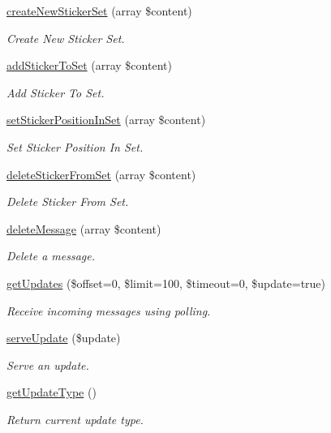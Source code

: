 \begin{DoxyCompactItemize}
\hyperlink{class_telegram_aa9ae79c6d122a0e0a88fb3b81e48aff1}{create\-New\-Sticker\-Set} (array \$content)
\begin{DoxyCompactList}\small\item\em Create New Sticker Set. \end{DoxyCompactList}\item 
\hyperlink{class_telegram_a1dd9ac39878694581875b53f100189da}{add\-Sticker\-To\-Set} (array \$content)
\begin{DoxyCompactList}\small\item\em Add Sticker To Set. \end{DoxyCompactList}\item 
\hyperlink{class_telegram_afe5e2d14ddabfb88fea538c2c778b3d8}{set\-Sticker\-Position\-In\-Set} (array \$content)
\begin{DoxyCompactList}\small\item\em Set Sticker Position In Set. \end{DoxyCompactList}\item 
\hyperlink{class_telegram_a98b2c8abebbc2e53bb02dbb2757238ae}{delete\-Sticker\-From\-Set} (array \$content)
\begin{DoxyCompactList}\small\item\em Delete Sticker From Set. \end{DoxyCompactList}\item 
\hyperlink{class_telegram_af46503521fd05da7d9e42313c5f29dd6}{delete\-Message} (array \$content)
\begin{DoxyCompactList}\small\item\em Delete a message. \end{DoxyCompactList}\item 
\hyperlink{class_telegram_adb467486d3d5e83ce21a03e00f17b16c}{get\-Updates} (\$offset=0, \$limit=100, \$timeout=0, \$update=true)
\begin{DoxyCompactList}\small\item\em Receive incoming messages using polling. \end{DoxyCompactList}\item 
\hyperlink{class_telegram_a57e6066940e4cca7310cfd5c45fd8510}{serve\-Update} (\$update)
\begin{DoxyCompactList}\small\item\em Serve an update. \end{DoxyCompactList}\item 
\hyperlink{class_telegram_a291f955d4bae8e89b42e0a762b9bcc33}{get\-Update\-Type} ()
\begin{DoxyCompactList}\small\item\em Return current update type. \end{DoxyCompactList}\end{DoxyCompactItemize}
